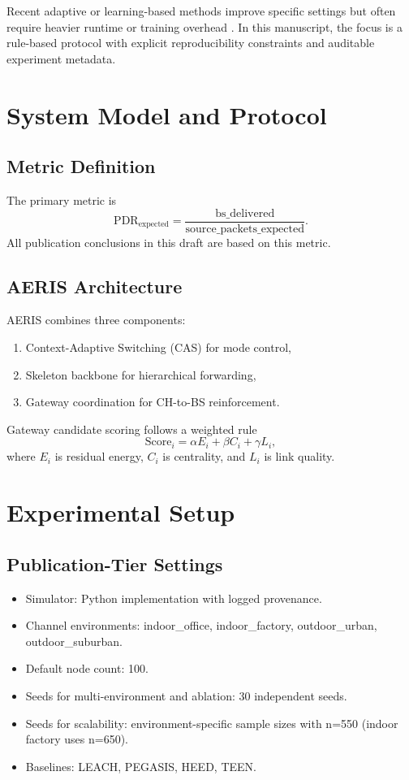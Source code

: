 ﻿\documentclass[sensors,article,submit,moreauthors,pdftex]{Definitions/mdpi}
\begin{document}
Recent adaptive or learning-based methods improve specific settings but often require heavier runtime or training overhead \cite{Ren2024,Okine2024}. In this manuscript, the focus is a rule-based protocol with explicit reproducibility constraints and auditable experiment metadata.

\section{System Model and Protocol}
\subsection{Metric Definition}
The primary metric is
\begin{equation}
\mathrm{PDR}_{\mathrm{expected}} = \frac{\mathrm{bs\_delivered}}{\mathrm{source\_packets\_expected}}.
\end{equation}
All publication conclusions in this draft are based on this metric.

\subsection{AERIS Architecture}
AERIS combines three components:
\begin{enumerate}
\item Context-Adaptive Switching (CAS) for mode control,
\item Skeleton backbone for hierarchical forwarding,
\item Gateway coordination for CH-to-BS reinforcement.
\end{enumerate}
Gateway candidate scoring follows a weighted rule
\begin{equation}
\mathrm{Score}_i = \alpha E_i + \beta C_i + \gamma L_i,
\end{equation}
where $E_i$ is residual energy, $C_i$ is centrality, and $L_i$ is link quality.

\section{Experimental Setup}
\subsection{Publication-Tier Settings}
\begin{itemize}
\item Simulator: Python implementation with logged provenance.
\item Channel environments: indoor\_office, indoor\_factory, outdoor\_urban, outdoor\_suburban.
\item Default node count: 100.
\item Seeds for multi-environment and ablation: 30 independent seeds.
\item Seeds for scalability: environment-specific sample sizes with n=550 (indoor factory uses n=650).
\item Baselines: LEACH, PEGASIS, HEED, TEEN.
\end{itemize}
\end{document}
